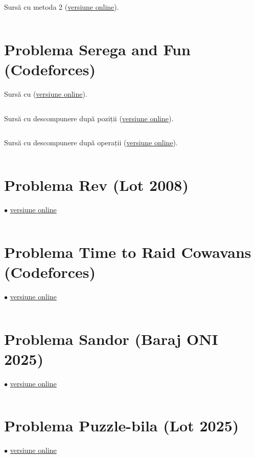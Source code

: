 \documentclass[../main.tex]{subfiles}
\begin{document}
\inputminted{cpp}{../src/sqrt-decomp/piezișă-1.cpp}

Sursă cu metoda 2 (\href{https://kilonova.ro/submissions/433318}{versiune online}).

\inputminted{cpp}{../src/sqrt-decomp/piezișă-2.cpp}

\section{Problema Serega and Fun (Codeforces)}
\label{code:serega-and-fun}

Sursă cu  (\href{https://codeforces.com/contest/455/submission/283737997}{versiune online}).

\inputminted{cpp}{../src/sqrt-decomp/serega-and-fun-1.cpp}

Sursă cu descompunere după poziții (\href{https://codeforces.com/contest/455/submission/228406306}{versiune online}).

\inputminted{cpp}{../src/sqrt-decomp/serega-and-fun-2.cpp}

Sursă cu descompunere după operații (\href{https://codeforces.com/contest/455/submission/282001929}{versiune online}).

\inputminted{cpp}{../src/sqrt-decomp/serega-and-fun-3.cpp}

\section{Problema Rev (Lot 2008)}
\label{code:rev}
$\bullet$
\href{https://kilonova.ro/submissions/810708}{versiune online}

\inputminted{cpp}{../src/sqrt-decomp/rev.cpp}

\section{Problema Time to Raid Cowavans (Codeforces)}
\label{code:time-to-raid-cowavans}
$\bullet$
\href{https://codeforces.com/contest/103/submission/346620317}{versiune online}

\inputminted{cpp}{../src/sqrt-decomp/time-to-raid-cowavans.cpp}

\section{Problema Sandor (Baraj ONI 2025)}
\label{code:sandor}
$\bullet$
\href{https://kilonova.ro/submissions/778528}{versiune online}

\inputminted{cpp}{../src/sqrt-decomp/sandor.cpp}

\section{Problema Puzzle-bila (Lot  2025)}
\label{code:puzzle-bila}
$\bullet$
\href{https://kilonova.ro/submissions/781209}{versiune online}

\inputminted{cpp}{../src/sqrt-decomp/puzzle-bila.cpp}
\end{document}
